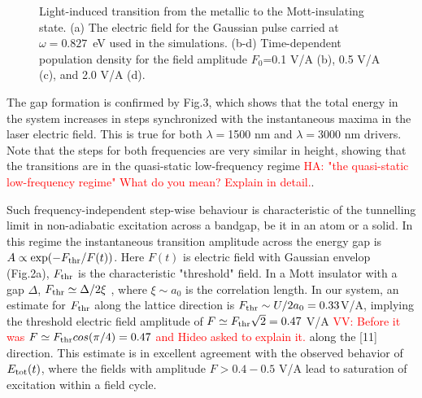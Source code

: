 \documentclass[prb,aps,twocolumn,showpacs,amsmath,amssymb]{revtex4}%
\begin{document}
\begin{figure}[h!]
\caption{Light-induced transition from the metallic to 
the Mott-insulating state. 
(a) The electric field for the Gaussian pulse carried at 
$\omega=0.827$~eV used in the simulations. 
(b-d) Time-dependent population density for 
the field amplitude $F_0$=0.1 V/A (b), 0.5 V/A (c), and  2.0 V/A (d).
}
\label{Fig2}  
\end{figure}

The gap formation is confirmed by Fig.3, which shows that
the total energy in the system increases in steps synchronized 
with the instantaneous maxima in the laser electric field. 
This is true for both $\lambda=$1500 nm and $\lambda=$3000 nm
drivers. Note that the steps  for both frequencies are
very similar in height, showing that the transitions are
in the quasi-static low-frequency regime \textcolor{red}{HA: "the quasi-static low-frequency regime" What do you mean?  Explain in detail.}.

Such frequency-independent step-wise behaviour is 
characteristic of the tunnelling limit in 
non-adiabatic excitation across a bandgap, be
it in an atom or a solid. In this regime the 
instantaneous transition amplitude across the 
energy gap is $A\propto \exp(-F_{\rm thr}/F(t))$. Here 
$F(t)$ is electric field with Gaussian envelop (Fig.2a),
$F_{\rm thr}$ is the characteristic "threshold" field.
In a Mott insulator with a gap $\Delta$, 
$F_{\rm thr}\simeq \Delta /2\xi$ \cite{Oka_2003,Oka_2005,Oka_2010,Oka_2012}, where
$\xi\sim a_0$ is the correlation length. In our system,
an estimate for $F_{\rm thr}$ 
along the lattice direction is $F_{\rm thr}\sim U/2a_0=0.33 $V/A,
implying the threshold electric field amplitude of $F\simeq F_{\rm thr}\sqrt{2}=0.47$ V/A \textcolor{red}{VV: Before it was $F\simeq F_{\rm thr}cos(\pi /4)=0.47$ and Hideo asked to explain it.} along the [11] direction. This estimate
is in excellent agreement with the observed behavior of 
$E_{\rm tot}(t)$, where the  
fields with amplitude $F>0.4-0.5$ V/A lead to 
saturation of excitation within a field cycle.
\end{document}
